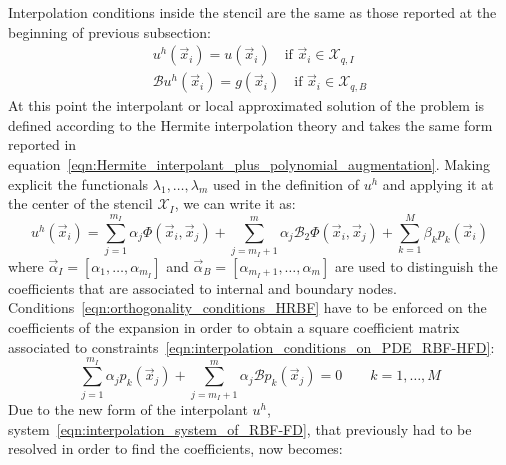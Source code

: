 Interpolation conditions inside the stencil are the same as those reported at the beginning of previous subsection:
\begin{subequations}
	\label{eqn:interpolation_conditions_on_PDE_RBF-HFD}
	\begin{gather}
		u^h(\vec{x}_i) = u(\vec{x}_i) \quad \text{if $\vec{x}_i \in \mathcal{X}_{q,I}$}  				\\
		\mathcal{B} u^h(\vec{x}_i) = g(\vec{x}_i) \quad \text{if $\vec{x}_i \in \mathcal{X}_{q,B}$}
	\end{gather}
\end{subequations}
At this point the interpolant or local approximated solution of the problem is defined according to the Hermite interpolation theory and takes the same form reported in equation~\eqref{eqn:Hermite_interpolant_plus_polynomial_augmentation}. Making explicit the functionals $\lambda_1, \dots, \lambda_m$ used in the definition of $u^h$ and applying it at the center of the stencil $\mathcal{X}_I$, we can write it as:
\begin{equation}
	\label{eqn:local_RBF-FD_interpolant_to_be_modified}
	u^h(\vec{x}_i) = \sum_{j=1}^{m_I} \alpha_j \Phi(\vec{x}_i, \vec{x}_j) + \sum_{j=m_I+1}^{m} \alpha_j \mathcal{B}_2\Phi(\vec{x}_i, \vec{x}_j) + \sum_{k=1}^{M} \beta_k p_k(\vec{x}_i)
\end{equation}
where $\vec{\alpha}_I = [\alpha_1, \dots, \alpha_{m_I}]$ and $\vec{\alpha}_B = [\alpha_{m_I+1}, \dots, \alpha_{m}]$ are used to distinguish the coefficients that are associated to internal and boundary nodes. Conditions~\eqref{eqn:orthogonality_conditions_HRBF} have to be enforced on the coefficients of the expansion in order to obtain a square coefficient matrix associated to constraints~\eqref{eqn:interpolation_conditions_on_PDE_RBF-HFD}:
\begin{equation}
	\sum_{j=1}^{m_I} \alpha_j p_k(\vec{x}_j) + \sum_{j={m_I+1}}^{m} \alpha_j \mathcal{B} p_k(\vec{x}_j)= 0 \qquad k=1, \dots, M
\end{equation}
Due to the new form of the interpolant $u^h$, system~\eqref{eqn:interpolation_system_of_RBF-FD}, that previously had to be resolved in order to find the coefficients, now becomes:
